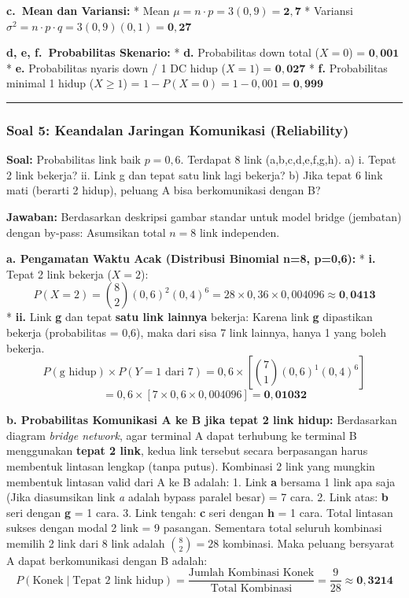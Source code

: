 \documentclass[
  letterpaper,
  DIV=11,
  numbers=noendperiod]{scrartcl}
\begin{document}
\textbf{c.~Mean dan Variansi:} * Mean
\(\mu = n \cdot p = 3(0,9) = \mathbf{2,7}\) * Variansi
\(\sigma^2 = n \cdot p \cdot q = 3(0,9)(0,1) = \mathbf{0,27}\)

\textbf{d, e, f.~Probabilitas Skenario:} * \textbf{d.} Probabilitas down
total (\(X=0\)) = \(\mathbf{0,001}\) * \textbf{e.} Probabilitas nyaris
down / 1 DC hidup (\(X=1\)) = \(\mathbf{0,027}\) * \textbf{f.}
Probabilitas minimal 1 hidup (\(X \ge 1\)) =
\(1 - P(X=0) = 1 - 0,001 = \mathbf{0,999}\)

\begin{center}\rule{0.5\linewidth}{0.5pt}\end{center}

\subsubsection{\texorpdfstring{\textbf{Soal 5: Keandalan Jaringan
Komunikasi
(Reliability)}}{Soal 5: Keandalan Jaringan Komunikasi (Reliability)}}\label{soal-5-keandalan-jaringan-komunikasi-reliability}

\textbf{Soal:} Probabilitas link baik \(p = 0,6\). Terdapat 8 link
(a,b,c,d,e,f,g,h). a) i. Tepat 2 link bekerja? ii. Link g dan tepat satu
link lagi bekerja? b) Jika tepat 6 link mati (berarti 2 hidup), peluang
A bisa berkomunikasi dengan B?

\textbf{Jawaban:} Berdasarkan deskripsi gambar standar untuk model
bridge (jembatan) dengan by-pass: Asumsikan total \(n=8\) link
independen.

\textbf{a. Pengamatan Waktu Acak (Distribusi Binomial n=8, p=0,6):} *
\textbf{i.} Tepat 2 link bekerja (\(X=2\)):
\[ P(X=2) = \binom{8}{2} (0,6)^2 (0,4)^6 = 28 \times 0,36 \times 0,004096 \approx \mathbf{0,0413} \]
* \textbf{ii.} Link \textbf{g} dan tepat \textbf{satu link lainnya}
bekerja: Karena link \textbf{g} dipastikan bekerja (probabilitas = 0,6),
maka dari sisa 7 link lainnya, hanya 1 yang boleh bekerja.
\[ P(\text{g hidup}) \times P(Y=1 \text{ dari } 7) = 0,6 \times \left[ \binom{7}{1} (0,6)^1 (0,4)^6 \right] \]
\[ = 0,6 \times [ 7 \times 0,6 \times 0,004096 ] = \mathbf{0,01032} \]

\textbf{b. Probabilitas Komunikasi A ke B jika tepat 2 link hidup:}
Berdasarkan diagram \emph{bridge network}, agar terminal A dapat
terhubung ke terminal B menggunakan \textbf{tepat 2 link}, kedua link
tersebut secara berpasangan harus membentuk lintasan lengkap (tanpa
putus). Kombinasi 2 link yang mungkin membentuk lintasan valid dari A ke
B adalah: 1. Link \textbf{a} bersama 1 link apa saja (Jika diasumsikan
link \emph{a} adalah bypass paralel besar) = 7 cara. 2. Link atas:
\textbf{b} seri dengan \textbf{g} = 1 cara. 3. Link tengah: \textbf{c}
seri dengan \textbf{h} = 1 cara. Total lintasan sukses dengan modal 2
link = 9 pasangan. Sementara total seluruh kombinasi memilih 2 link dari
8 link adalah \(\binom{8}{2} = 28\) kombinasi. Maka peluang bersyarat A
dapat berkomunikasi dengan B adalah:
\[ P(\text{Konek} \mid \text{Tepat 2 link hidup}) = \frac{\text{Jumlah Kombinasi Konek}}{\text{Total Kombinasi}} = \frac{9}{28} \approx \mathbf{0,3214} \]
\end{document}
